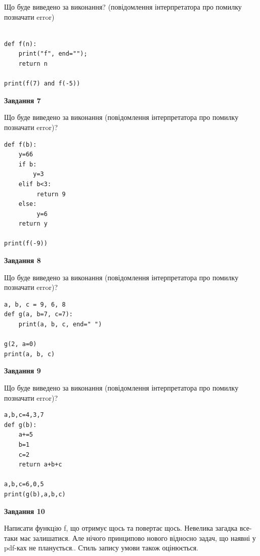 \documentclass[12pt, ukrainian]{article}
\begin{document}
{\begin {large}
Що буде виведено за виконання? (повідомлення інтерпретатора про помилку позначати error)\par
\begin{verbatim}

def f(n):
    print("f", end="");
    return n

print(f(7) and f(-5))
\end{verbatim}

{\begin {center}\textbf{Завдання 7}\end {center}}

Що буде виведено за виконання (повідомлення інтерпретатора про помилку позначати error)?\par
\begin{verbatim}
def f(b):
    y=66
    if b: 
        y=3
    elif b<3:
         return 9
    else:
         y=6
    return y

print(f(-9))
\end{verbatim}

{\begin {center}\textbf{Завдання 8}\end {center}}

Що буде виведено за виконання (повідомлення інтерпретатора про помилку позначати error)?\par
\begin{verbatim}
a, b, c = 9, 6, 8
def g(a, b=7, c=7):
    print(a, b, c, end=" ")

g(2, a=0)
print(a, b, c)
\end{verbatim}

{\begin {center}\textbf{Завдання 9}\end {center}}

Що буде виведено за виконання (повідомлення інтерпретатора про помилку позначати error)?\par
\begin{verbatim}
a,b,c=4,3,7
def g(b):
    a+=5
    b=1
    c=2
    return a+b+c

a,b,c=6,0,5
print(g(b),a,b,c)
\end{verbatim}

{\begin {center}\textbf{Завдання 10}\end {center}}


Написати функцiю f, що отримує щось та повертає щось. Невелика загадка все-таки має залишатися. Але нічого принципово нового відносно задач, що наявні у pdf-ках не планується.. Стиль запису умови також оцінюється.\par
\end {large}}
\newpage
\end{document}
